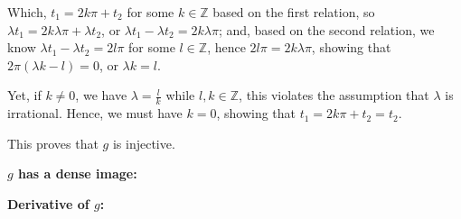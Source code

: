 \documentclass{article}
\begin{document}
\begin{itemize}
    Which, $t_1 = 2k\pi + t_2$ for some $k\in\mathbb{Z}$ based on the first relation, so $\lambda t_1 = 2k\lambda \pi + \lambda t_2$, or $\lambda t_1-\lambda t_2 = 2k\lambda \pi$;
    and, based on the second relation, we know $\lambda t_1 - \lambda t_2 = 2l\pi$ for some $l\in\mathbb{Z}$, hence $2l\pi = 2k\lambda \pi$, showing that $2\pi (\lambda k-l)=0$, or $\lambda k=l$.

    Yet, if $k\neq 0$, we have $\lambda = \frac{l}{k}$ while $l,k\in\mathbb{Z}$, this violates the assumption that $\lambda$ is irrational. Hence, we must have $k=0$, showing that $t_1 = 2k\pi + t_2 = t_2$.

    This proves that $g$ is injective.

    \hfil

    \textbf{$g$ has a dense image:}

    \hfil

    \textbf{Derivative of $g$:}


\end{itemize}
\end{document}
